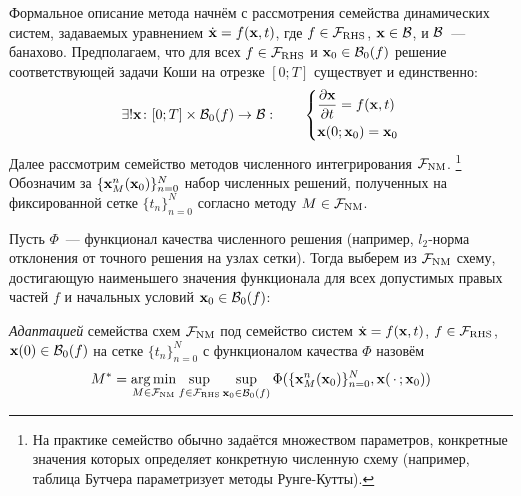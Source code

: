 Формальное описание метода начнём с рассмотрения семейства динамических систем,
задаваемых уравнением $ \dot{\mathbf{x}} = f(\mathbf{x}, t) $,
где $ f \in \mathcal{F}_{\textnormal{RHS}} $, $ \mathbf{x} \in \mathcal{B} $, и $ \mathcal{B} $~--- банахово.
Предполагаем, что для всех $ f \in \mathcal{F}_{\textnormal{RHS}} $ и $ \mathbf{x}_0 \in \mathcal{B}_0(f) $ решение соответствующей задачи Коши
на отрезке $ [0; T] $ существует и единственно:
\[
    \exists! \mathbf{x} \colon [0; T] \times \mathcal{B}_0(f) \to \mathcal{B}: \qquad
    \begin{dcases}
        \frac{\partial \mathbf{x}}{\partial t} = f(\mathbf{x}, t) \\
        \mathbf{x}(0; \mathbf{x}_0) = \mathbf{x}_0
    \end{dcases}
\]
Далее рассмотрим семейство методов численного интегрирования $ \mathcal{F}_{\textnormal{NM}} $.%
\footnote{На практике семейство обычно задаётся множеством параметров,
конкретные значения которых определяет конкретную численную схему
(например, таблица Бутчера параметризует методы Рунге-Кутты).}
Обозначим за $ \{ \mathbf{x}_M^n(\mathbf{x}_0) \}_{n=0}^{N} $ набор численных решений,
полученных на фиксированной сетке $ \{ t_n \}_{n=0}^N $ согласно методу $ M \in \mathcal{F}_{\textnormal{NM}} $.

Пусть $ \Phi $~--- функционал качества численного решения
(например, $ l_2 $-норма отклонения от точного решения на узлах сетки).
Тогда выберем из $ \mathcal{F}_{\textnormal{NM}} $ схему,
достигающую наименьшего значения функционала
для всех допустимых правых частей $ f $ и начальных условий $ \mathbf{x}_0 \in \mathcal{B}_0(f) $:

\begin{definition}
    \label{definition:adaptation_method:adapted_numerical_method}
    \emph{Адаптацией} семейства схем $ \mathcal{F}_{\textnormal{NM}} $ под семейство систем $ \dot{\mathbf{x}} = f(\mathbf{x}, t) $,
    $ f \in \mathcal{F}_{\textnormal{RHS}} $, $ \mathbf{x}(0) \in \mathcal{B}_0(f) $ на сетке $ \{ t_n \}_{n=0}^N $ с функционалом качества $ \Phi $
    назовём
    \begin{equation}
        \label{eq:adaptation_method:adapted_numerical_method}
        M^* = \operatorname*{\arg\min}_{M \in \mathcal{F}_{\textnormal{NM}}} \sup_{f \in \mathcal{F}_{\textnormal{RHS}}} \sup_{\mathbf{x}_0 \in \mathcal{B}_0(f)} \Phi(\{ \mathbf{x}_M^n(\mathbf{x}_0) \}_{n=0}^N, \mathbf{x}(\,\cdot\,; \mathbf{x}_0) )
    \end{equation}
\end{definition}

